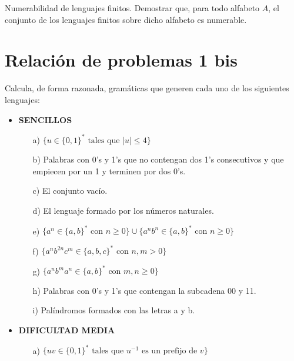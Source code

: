 \documentclass[12pt]{report} %
\begin{document}
\begin{ejercicio}
Numerabilidad de lenguajes finitos. Demostrar que, para todo alfabeto $A$, el conjunto de los lenguajes finitos sobre dicho alfabeto es numerable.
\end{ejercicio}

\newpage

\hypertarget{relaciuxf3n-de-problemas-1-bis}{%
\section{Relación de problemas 1
bis}\label{relaciuxf3n-de-problemas-1-bis}}

\begin{ejercicio}
Calcula, de forma razonada, gramáticas que generen cada uno de los siguientes lenguajes:

\begin{itemize}
    \item \textbf{SENCILLOS}
    \begin{itemize}
        \item[a)] $\{u \in \{0, 1\}^* \text{ tales que } |u| \leq 4\}$
        \item[b)] Palabras con 0’s y 1’s que no contengan dos 1’s consecutivos y que empiecen por un 1 y terminen por dos 0’s.
        \item[c)] El conjunto vacío.
        \item[d)] El lenguaje formado por los números naturales.
        \item[e)] $\{a^n \in \{a, b\}^* \text{ con } n \geq 0\} \cup \{a^n b^n \in \{a, b\}^* \text{ con } n \geq 0\}$
        \item[f)] $\{a^n b^{2n} c^m \in \{a, b, c\}^* \text{ con } n, m > 0\}$
        \item[g)] $\{a^n b^m a^n \in \{a, b\}^* \text{ con } m, n \geq 0\}$
        \item[h)] Palabras con 0’s y 1’s que contengan la subcadena 00 y 11.
        \item[i)] Palíndromos formados con las letras a y b.
    \end{itemize}

    \item \textbf{DIFICULTAD MEDIA}
    \begin{itemize}
        \item[a)] $\{uv \in \{0, 1\}^* \text{ tales que } u^{-1} \text{ es un prefijo de } v\}$
        \begin{solucion}[media.a]


\end{solucion}
\end{itemize}
\end{itemize}
\end{ejercicio}
\end{document}
